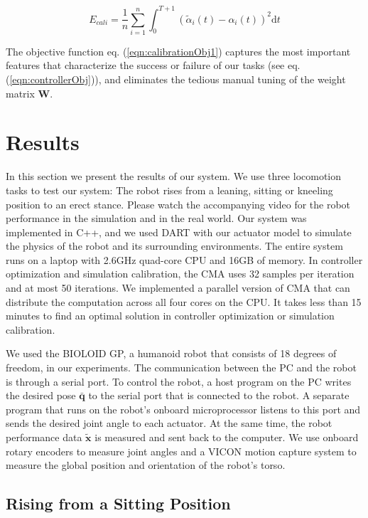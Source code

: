 \begin{equation}
  E_{cali}=\frac{1}{n}\sum_{i=1}^{n}\int_{0}^{T+1}(\tilde{\alpha}_i(t)-\alpha_i(t))^2\mathrm{d}t
  \label{eqn:calibrationObj1}
\end{equation}

The objective function eq. (\ref{eqn:calibrationObj1}) captures the most important features that characterize the success or failure of our tasks (see eq.(\ref{eqn:controllerObj})), and eliminates the tedious manual tuning of the weight matrix $\mathbf{W}$.

\section{Results}
In this section we present the results of our system. We use three locomotion tasks to test our system: The robot rises from a leaning, sitting or kneeling position to an erect stance. Please watch the accompanying video for the robot performance in the simulation and in the real world. Our system was implemented in C++, and we used DART with our actuator model to simulate the physics of the robot and its surrounding environments. The entire system runs on a laptop with 2.6GHz quad-core CPU and 16GB of memory. In controller optimization and simulation calibration, the CMA uses 32 samples per iteration and at most 50 iterations. We implemented a parallel version of CMA that can distribute the computation across all four cores on the CPU. It takes less than 15 minutes to find an optimal solution in controller optimization or simulation calibration.

We used the BIOLOID GP, a humanoid robot that consists of 18 degrees of freedom, in our experiments. The communication between the PC and the robot is through a serial port. To control the robot, a host program on the PC writes the desired pose $\bar{\mathbf{q}}$ to the serial port that is connected to the robot. A separate program that runs on the robot's onboard microprocessor listens to this port and sends the desired joint angle to each actuator. At the same time, the robot performance data $\tilde{\mathbf{x}}$ is measured and sent back to the computer. We use onboard rotary encoders to measure joint angles and a VICON motion capture system to measure the global position and orientation of the robot's torso.

\subsection{Rising from a Sitting Position}

